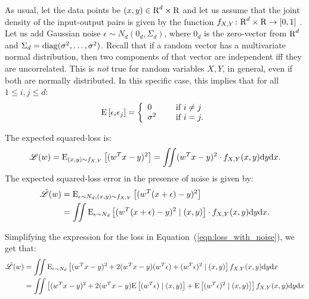 As usual, let the data points be 
$(x, y) \in \text{R}^{d} \times \text{R}$ and let us assume that the joint density 
of the input-output pairs is given by the function 
$f_{X, Y} \colon \text{R}^{d} \times \text{R} \to [0, 1]$ . Let us add Gaussian noise 
$\epsilon \sim N_d(0_d, \Sigma_d)$, where $0_d$ is the zero-vector 
from $\text{R}^d$ and $\Sigma_d = \operatorname{diag}(\sigma^2, \ldots, \sigma^2)$. Recall that 
if a random vector has a multivariate normal distribution, then two components
of that vector are independent iff they are uncorrelated. This is \emph{not} 
true for random variables $X, Y$, in general, even if both are normally distributed. 
In this specific case, this implies that for all $1 \leq i, j \leq d$: 
\begin{equation}
    \text{E} \left [  \epsilon_i \epsilon_j  \right ]= 
    \left \{ \begin{array}{ll} 
                0        & \quad \text{ if } i \neq j \\
                \sigma^2 & \quad \text{ if } i = j. 
              \end{array}
    \right .
\end{equation}

The expected squared-loss is:
\begin{equation}
    \mathscr{L} (w) = \text{E}_{(x, y) \sim f_{X, Y}} \left [ (w^T x - y)^2 \right ]  
              = \iint (w^T x - y)^2 \cdot f_{X, Y}(x, y) \text{d} y \text{d} x.
\end{equation}
The expected squared-loss error in the presence of noise is given by:
\begin{align}
    \label{eqn:loss_with_noise}
    \tilde{\mathscr{L}} (w) 
        & = \text{E}_{\epsilon \sim N_d, (x, y) \sim f_{X, Y}} \left [ (w^T (x + \epsilon) - y)^2 \right ] \nonumber \\ 
        & = \iint \text{E}_{\epsilon \sim N_d} \left [ (w^T (x + \epsilon) - y)^2 \mid (x, y) \right ] \cdot f_{X, Y}(x, y) \text{d} y \text{d} x.
\end{align}

Simplifying the expression for the loss in Equation~(\ref{eqn:loss_with_noise}), we get
that:
\begin{align}
    \label{eqn:loss_with_noise_simple}
    \tilde{\mathscr{L}} (w) 
        & = \iint \text{E}_{\epsilon \sim N_d} \left [  (w^T x - y)^2 + 
                           2(w^T x - y) (w^T \epsilon) + 
                           (w^T \epsilon)^2 
                           \mid (x, y) \right ] 
                   f_{X, Y}(x, y) \text{d} y \text{d} x \nonumber \\
        & = \iint \left [ (w^T x - y)^2 + 2(w^T x - y) \text{E} \left [ (w^T \epsilon) \mid (x, y) \right ] + 
                          \text{E} \left [ (w^T \epsilon)^2 \mid (x, y) \right ] \right ] f_{X, Y}(x, y) \text{d} y \text{d} x   
\end{align}

